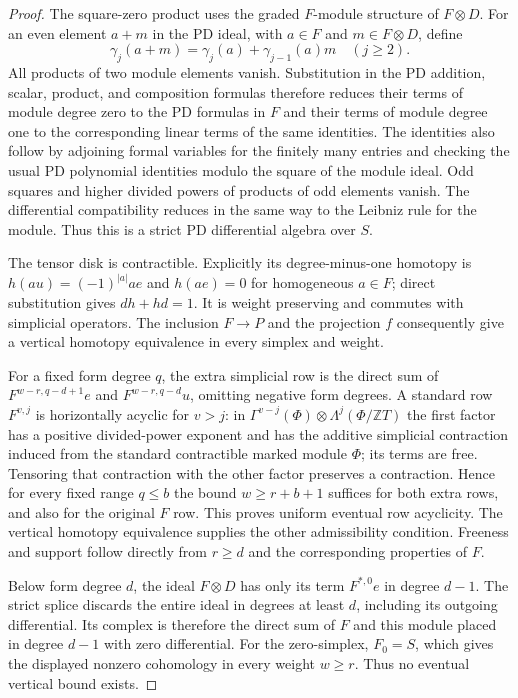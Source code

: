 \begin{proof}
The square-zero product uses the graded $F$-module structure of
$F\otimes D$. For an even element $a+m$ in the PD ideal, with
$a\in F$ and $m\in F\otimes D$, define
\[
 \gamma_j(a+m)=\gamma_j(a)+\gamma_{j-1}(a)m
 \quad(j\geq2).
\]
All products of two module elements vanish. Substitution in the
PD addition, scalar, product, and composition formulas therefore
reduces their terms of module degree zero to the PD formulas in
$F$ and their terms of module degree one to the corresponding
linear terms of the same identities. The identities also follow
by adjoining formal variables for the finitely many entries and
checking the usual PD polynomial identities modulo the square
of the module ideal. Odd squares and higher divided powers of
products of odd elements vanish. The differential compatibility
reduces in the same way to the Leibniz rule for the module.
Thus this is a strict PD differential algebra over $S$.

The tensor disk is contractible. Explicitly its degree-minus-one
homotopy is $h(a u)=(-1)^{|a|}a e$ and $h(a e)=0$ for homogeneous
$a\in F$; direct substitution gives $dh+hd=1$. It is weight
preserving and commutes with simplicial operators. The inclusion
$F\to P$ and the projection $f$ consequently give a vertical
homotopy equivalence in every simplex and weight.

For a fixed form degree $q$, the extra simplicial row is the
direct sum of $F^{w-r,q-d+1}e$ and $F^{w-r,q-d}u$, omitting
negative form degrees. A standard row $F^{v,j}$ is horizontally
acyclic for $v>j$: in
$\Gamma^{v-j}(\Phi)\otimes\Lambda^j(\Phi/\mathbb ZT)$ the first
factor has a positive divided-power exponent and has the
additive simplicial contraction induced from the standard
contractible marked module $\Phi$; its terms are free.
Tensoring that contraction with the other factor preserves a
contraction. Hence for every fixed range $q\leq b$ the bound
$w\geq r+b+1$ suffices for both extra rows, and also for the
original $F$ row. This proves uniform eventual row acyclicity.
The vertical homotopy equivalence supplies the other
admissibility condition. Freeness and support follow directly
from $r\geq d$ and the corresponding properties of $F$.

Below form degree $d$, the ideal $F\otimes D$ has only its
term $F^{*,0}e$ in degree $d-1$. The strict splice discards
the entire ideal in degrees at least $d$, including its outgoing
differential. Its complex is therefore the direct sum of $F$
and this module placed in degree $d-1$ with zero differential.
For the zero-simplex, $F_0=S$, which gives the displayed
nonzero cohomology in every weight $w\geq r$. Thus no
eventual vertical bound exists.
\end{proof}
